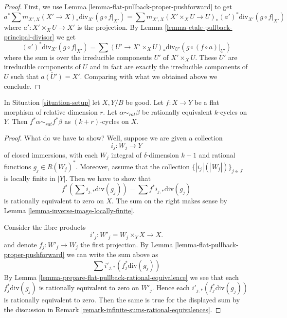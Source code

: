 \begin{proof}
First, we use Lemma \ref{lemma-flat-pullback-proper-pushforward}
to get
$$
a^*\sum m_{X', X} (X' \to X)_*\text{div}_{X'}(g \circ f|_{X'}) =
\sum m_{X', X} (X' \times_X U \to U)_*(a')^*\text{div}_{X'}(g \circ f|_{X'})
$$
where $a' : X' \times_X U \to X'$ is the projection.
By Lemma \ref{lemma-etale-pullback-principal-divisor}
we get
$$
(a')^*\text{div}_{X'}(g \circ f|_{X'}) =
\sum (U' \to X' \times_X U)_*\text{div}_{U'}(g \circ (f \circ a)|_{U'})
$$
where the sum is over the irreducible components $U'$ of $X' \times_X U$.
These $U'$ are irreducible components of $U$ and in fact are exactly the
irreducible components of $U$ such that $\overline{a(U')} = X'$.
Comparing with what we obtained above we conclude.
\end{proof}

\begin{lemma}
\label{lemma-flat-pullback-rational-equivalence}
In Situation \ref{situation-setup} let $X, Y/B$ be good.
Let $f : X \to Y$ be a flat morphism of relative dimension $r$.
Let $\alpha \sim_{rat} \beta$ be rationally equivalent $k$-cycles
on $Y$. Then $f^*\alpha \sim_{rat} f^*\beta$ as $(k + r)$-cycles on $X$.
\end{lemma}

\begin{proof}
What do we have to show? Well, suppose we are given a collection
$$
i_j : W_j \longrightarrow Y
$$
of closed immersions, with each $W_j$ integral of $\delta$-dimension $k + 1$
and rational functions $g_j \in R(W_j)^*$. Moreover, assume that
the collection $\{|i_j|(|W_j|)\}_{j \in J}$ is locally finite in $|Y|$.
Then we have to show that
$$
f^*(\sum i_{j, *}\text{div}(g_j)) = \sum f^*i_{j, *}\text{div}(g_j)
$$
is rationally equivalent to zero on $X$. The sum on the right
makes sense by Lemma \ref{lemma-inverse-image-locally-finite}.

\medskip\noindent
Consider the fibre products
$$
i'_j : W'_j = W_j \times_Y X \longrightarrow X.
$$
and denote $f_j : W'_j \to W_j$ the first projection.
By Lemma \ref{lemma-flat-pullback-proper-pushforward}
we can write the sum above as
$$
\sum i'_{j, *}(f_j^*\text{div}(g_j))
$$
By Lemma \ref{lemma-prepare-flat-pullback-rational-equivalence}
we see that each $f_j^*\text{div}(g_j)$ is rationally equivalent
to zero on $W'_j$. Hence each $i'_{j, *}(f_j^*\text{div}(g_j))$
is rationally equivalent to zero. Then the same is true for
the displayed sum by the discussion in
Remark \ref{remark-infinite-sums-rational-equivalences}.
\end{proof}

